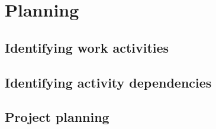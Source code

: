 \section{Planning}
\subsection{Identifying work activities}

\subsection{Identifying activity dependencies}

\subsection{Project planning}
